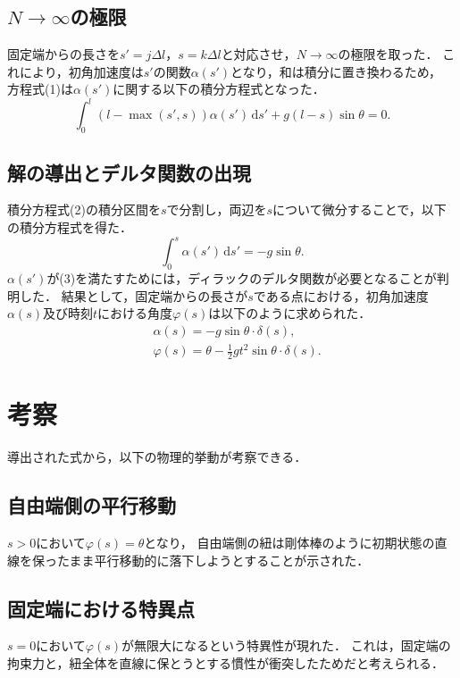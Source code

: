 \documentclass[9pt, twocolumn, a4paper]{ltjsarticle}
\begin{document}
\subsection{$N \to \infty$の極限}
固定端からの長さを$s' = j \Delta l$，$s = k \Delta l$と対応させ，$N \to \infty$の極限を取った．
これにより，初角加速度は$s'$の関数$\alpha \left(s'\right)$となり，和は積分に置き換わるため，
方程式(1)は$\alpha \left(s'\right)$に関する以下の積分方程式となった．
\begin{equation}
  \int_{0}^{l} \left(l - \max \left(s', s\right)\right)
  \alpha\left(s'\right) \,\mathrm{d}s'
  + g \left(l - s\right) \sin \theta = 0. 
\end{equation}
\subsection{解の導出とデルタ関数の出現}
積分方程式(2)の積分区間を$s$で分割し，両辺を$s$について微分することで，以下の積分方程式を得た．
\begin{equation}
  \int_{0}^{s} \alpha\left(s'\right) \,\mathrm{d}s' = -g \sin \theta.
\end{equation}
$\alpha \left(s'\right)$が(3)を満たすためには，ディラックのデルタ関数が必要となることが判明した．
結果として，固定端からの長さが$s$である点における，初角加速度$\alpha \left(s\right)$及び時刻$t$における角度$\varphi \left(s\right)$は以下のように求められた．
\begin{equation}
\begin{aligned}
  & \alpha\left(s\right) = -g \sin \theta \cdot \delta \left(s\right), \\
  & \varphi\left(s\right) = \theta - \frac{1}{2} g t^2 \sin \theta \cdot \delta \left(s\right).
\end{aligned}
\end{equation}

\section{考察}
導出された式から，以下の物理的挙動が考察できる．
\subsection{自由端側の平行移動}
$s > 0$において$\varphi\left(s\right) = \theta$となり，
自由端側の紐は剛体棒のように初期状態の直線を保ったまま平行移動的に落下しようとすることが示された．
\subsection{固定端における特異点}
$s = 0$において$\varphi\left(s\right)$が無限大になるという特異性が現れた．
これは，固定端の拘束力と，紐全体を直線に保とうとする慣性が衝突したためだと考えられる．
\end{document}
